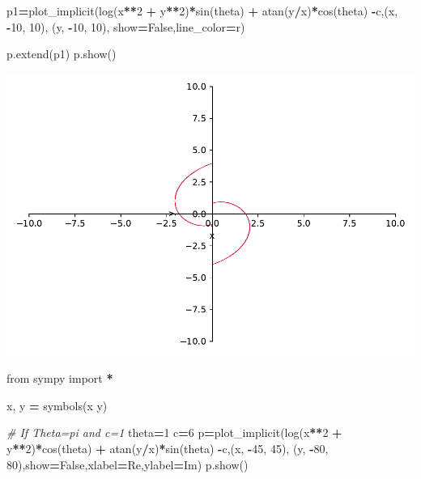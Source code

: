 \documentclass[
]{book}
\newenvironment{Shaded}{\begin{snugshade}}{\end{snugshade}}
\newcommand{\CommentTok}[1]{\textcolor[rgb]{0.56,0.35,0.01}{\textit{#1}}}
\newcommand{\DecValTok}[1]{\textcolor[rgb]{0.00,0.00,0.81}{#1}}
\newcommand{\ImportTok}[1]{#1}
\newcommand{\NormalTok}[1]{#1}
\newcommand{\OperatorTok}[1]{\textcolor[rgb]{0.81,0.36,0.00}{\textbf{#1}}}
\newcommand{\StringTok}[1]{\textcolor[rgb]{0.31,0.60,0.02}{#1}}
\newcommand{\VariableTok}[1]{\textcolor[rgb]{0.00,0.00,0.00}{#1}}
\theoremstyle{definition}
\theoremstyle{definition}
\theoremstyle{definition}
\theoremstyle{definition}
\theoremstyle{remark}
\begin{document}
\begin{Shaded}
\begin{Highlighting}[]
\NormalTok{p1}\OperatorTok{=}\NormalTok{plot\_implicit(log(x}\OperatorTok{**}\DecValTok{2} \OperatorTok{+}\NormalTok{ y}\OperatorTok{**}\DecValTok{2}\NormalTok{)}\OperatorTok{*}\NormalTok{sin(theta) }\OperatorTok{+}\NormalTok{ atan(y}\OperatorTok{/}\NormalTok{x)}\OperatorTok{*}\NormalTok{cos(theta) }\OperatorTok{{-}}\NormalTok{c,(x, }\OperatorTok{{-}}\DecValTok{10}\NormalTok{, }\DecValTok{10}\NormalTok{), (y, }\OperatorTok{{-}}\DecValTok{10}\NormalTok{, }\DecValTok{10}\NormalTok{), show}\OperatorTok{=}\VariableTok{False}\NormalTok{,line\_color}\OperatorTok{=}\StringTok{\textquotesingle{}r\textquotesingle{}}\NormalTok{)}

\NormalTok{p.extend(p1)}
\NormalTok{p.show()}
\end{Highlighting}
\end{Shaded}

\includegraphics{ConformalMapping_files/figure-latex/unnamed-chunk-61-8.pdf}

\begin{Shaded}
\begin{Highlighting}[]
\ImportTok{from}\NormalTok{ sympy }\ImportTok{import} \OperatorTok{*}

\NormalTok{x, y }\OperatorTok{=}\NormalTok{ symbols(}\StringTok{\textquotesingle{}x y\textquotesingle{}}\NormalTok{)}

\CommentTok{\# If Theta=pi and c=1}
\NormalTok{theta}\OperatorTok{=}\DecValTok{1}
\NormalTok{c}\OperatorTok{=}\DecValTok{6}
\NormalTok{p}\OperatorTok{=}\NormalTok{plot\_implicit(log(x}\OperatorTok{**}\DecValTok{2} \OperatorTok{+}\NormalTok{ y}\OperatorTok{**}\DecValTok{2}\NormalTok{)}\OperatorTok{*}\NormalTok{cos(theta) }\OperatorTok{+}\NormalTok{ atan(y}\OperatorTok{/}\NormalTok{x)}\OperatorTok{*}\NormalTok{sin(theta) }\OperatorTok{{-}}\NormalTok{c,(x, }\OperatorTok{{-}}\DecValTok{45}\NormalTok{, }\DecValTok{45}\NormalTok{), (y, }\OperatorTok{{-}}\DecValTok{80}\NormalTok{, }\DecValTok{80}\NormalTok{),show}\OperatorTok{=}\VariableTok{False}\NormalTok{,xlabel}\OperatorTok{=}\StringTok{\textquotesingle{}Re\textquotesingle{}}\NormalTok{,ylabel}\OperatorTok{=}\StringTok{\textquotesingle{}Im\textquotesingle{}}\NormalTok{)}
\NormalTok{p.show()}
\end{Highlighting}
\end{Shaded}
\end{document}
